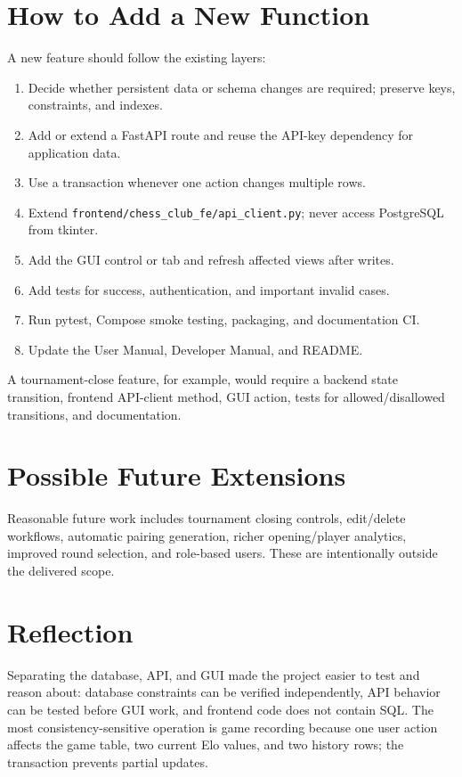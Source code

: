 \documentclass[11pt,a4paper]{article}
\begin{document}
\section{How to Add a New Function}
A new feature should follow the existing layers:
\begin{enumerate}
  \item Decide whether persistent data or schema changes are required; preserve keys, constraints, and indexes.
  \item Add or extend a FastAPI route and reuse the API-key dependency for application data.
  \item Use a transaction whenever one action changes multiple rows.
  \item Extend \texttt{frontend/chess\_club\_fe/api\_client.py}; never access PostgreSQL from tkinter.
  \item Add the GUI control or tab and refresh affected views after writes.
  \item Add tests for success, authentication, and important invalid cases.
  \item Run pytest, Compose smoke testing, packaging, and documentation CI.
  \item Update the User Manual, Developer Manual, and README.
\end{enumerate}

A tournament-close feature, for example, would require a backend state transition, frontend API-client method, GUI action, tests for allowed/disallowed transitions, and documentation.

\section{Possible Future Extensions}
Reasonable future work includes tournament closing controls, edit/delete workflows, automatic pairing generation, richer opening/player analytics, improved round selection, and role-based users. These are intentionally outside the delivered scope.

\section{Reflection}
Separating the database, API, and GUI made the project easier to test and reason about: database constraints can be verified independently, API behavior can be tested before GUI work, and frontend code does not contain SQL. The most consistency-sensitive operation is game recording because one user action affects the game table, two current Elo values, and two history rows; the transaction prevents partial updates.
\end{document}
